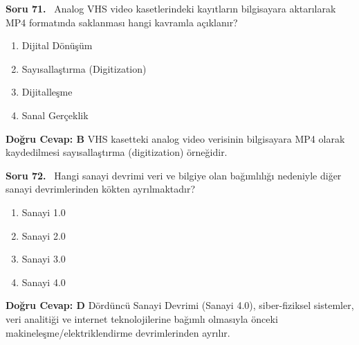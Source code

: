 \documentclass[11pt,a4paper,openany]{book}
\begin{document}
\needspace{5cm}
\vspace{8pt}
\noindent\textbf{\large\sffamily Soru 71.} \ Analog VHS video kasetlerindeki kayıtların bilgisayara aktarılarak MP4 formatında saklanması hangi kavramla açıklanır?
\begin{enumerate}[label=\Alph*), leftmargin=25pt, topsep=4pt, itemsep=2pt]
    \item Dijital Dönüşüm
    \item Sayısallaştırma (Digitization)
    \item Dijitalleşme
    \item Sanal Gerçeklik
\end{enumerate}
\vspace{4pt}
\begin{tcolorbox}[title=Cevap ve Açıklama, colback=gray!3!white, colframe=primarycolor!90!black, arc=2mm, fonttitle=\bfseries\sffamily, top=6pt, bottom=6pt]
    \textbf{Doğru Cevap: B}
    \vspace{2pt}
    VHS kasetteki analog video verisinin bilgisayara MP4 olarak kaydedilmesi sayısallaştırma (digitization) örneğidir.
\end{tcolorbox}
\vspace{10pt}

\needspace{5cm}
\vspace{8pt}
\noindent\textbf{\large\sffamily Soru 72.} \ Hangi sanayi devrimi veri ve bilgiye olan bağımlılığı nedeniyle diğer sanayi devrimlerinden kökten ayrılmaktadır?
\begin{enumerate}[label=\Alph*), leftmargin=25pt, topsep=4pt, itemsep=2pt]
    \item Sanayi 1.0
    \item Sanayi 2.0
    \item Sanayi 3.0
    \item Sanayi 4.0
\end{enumerate}
\vspace{4pt}
\begin{tcolorbox}[title=Cevap ve Açıklama, colback=gray!3!white, colframe=primarycolor!90!black, arc=2mm, fonttitle=\bfseries\sffamily, top=6pt, bottom=6pt]
    \textbf{Doğru Cevap: D}
    \vspace{2pt}
    Dördüncü Sanayi Devrimi (Sanayi 4.0), siber-fiziksel sistemler, veri analitiği ve internet teknolojilerine bağımlı olmasıyla önceki makineleşme/elektriklendirme devrimlerinden ayrılır.
\end{tcolorbox}
\vspace{10pt}
\end{document}
